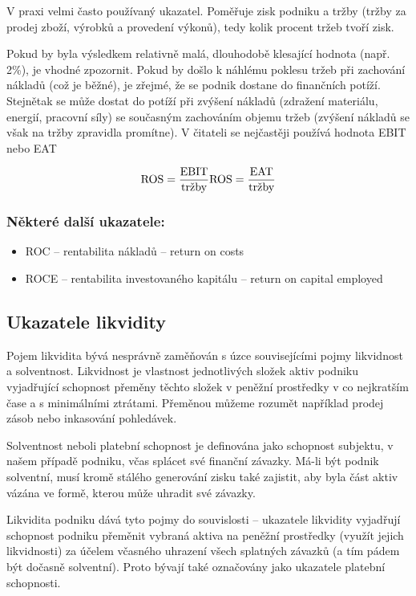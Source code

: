 V praxi velmi často používaný ukazatel. Poměřuje zisk podniku a tržby (tržby za prodej zboží, výrobků a provedení výkonů), tedy kolik procent tržeb tvoří zisk.

Pokud by byla výsledkem relativně malá, dlouhodobě klesající hodnota (např. 2\%), je vhodné zpozornit. Pokud by došlo k náhlému poklesu tržeb při zachování nákladů (což je běžné), je zřejmé, že se podnik dostane do finančních potíží. Stejnětak se může dostat do potíží při zvýšení nákladů (zdražení materiálu, energií, pracovní síly) se současným zachováním objemu tržeb (zvýšení nákladů se však na tržby zpravidla promítne). 
V čitateli se nejčastěji používá hodnota EBIT nebo EAT

$$\text{ROS} = \dfrac{\text{EBIT}}{\text{tržby}} \text{ROS} = \dfrac{\text{EAT}}{\text{tržby}}$$ 

\subsubsection{Některé další ukazatele:}
\begin{itemize}
\item{ROC -- rentabilita nákladů} -- return on costs
\item{ROCE -- rentabilita investovaného kapitálu} -- return on capital employed
\end{itemize}







\subsection{Ukazatele likvidity}
Pojem likvidita bývá nesprávně zaměňován s úzce souvisejícími pojmy likvidnost a solventnost. Likvidnost je vlastnost jednotlivých složek aktiv podniku vyjadřující schopnost přeměny těchto složek v peněžní prostředky v co nejkratším čase a s minimálními ztrátami\cite{nyvlt}. Přeměnou můžeme rozumět například prodej zásob nebo inkasování pohledávek. 

Solventnost neboli platební schopnost je definována jako schopnost subjektu, v našem případě podniku, včas splácet své finanční závazky. Má-li být podnik solventní, musí kromě stálého generování zisku také zajistit, aby byla část aktiv vázána ve formě, kterou může uhradit své závazky.

Likvidita podniku dává tyto pojmy do souvislosti -- ukazatele likvidity vyjadřují schopnost podniku přeměnit vybraná aktiva na peněžní prostředky (využít jejich likvidnosti) za účelem včasného uhrazení všech splatných závazků (a tím pádem být dočasně solventní)\cite{schol}. Proto bývají také označovány jako ukazatele platební schopnosti.

